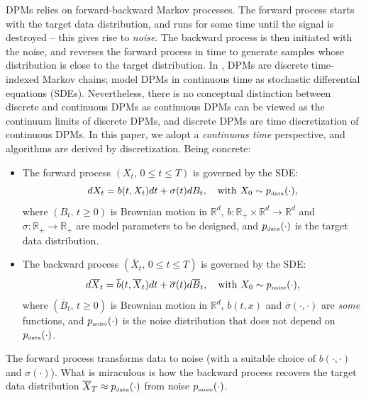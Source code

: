 \documentclass[letterpaper,11pt,reqno]{amsart}
\numberwithin{equation}{section}
\begin{document}
\quad DPMs relies on forward-backward Markov processes.
The forward process starts with the target data distribution, 
and runs for some time until the signal is destroyed --
this gives rise to {\em noise}. 
The backward process is then initiated with the noise, 
and reverses the forward process in time to generate samples
whose distribution is close to the target distribution.
In \cite{Song19, Ho20, Austin21}, DPMs are discrete time-indexed Markov chains;
\cite{Song20, Song21, Chen23} model DPMs in continuous time as 
stochastic differential equations (SDEs).
Nevertheless,
there is no conceptual distinction between discrete and continuous DPMs
as continuous DPMs can be viewed as the continuum limits of discrete DPMs,
and discrete DPMs are time discretization of continuous DPMs.
In this paper, we adopt a {\em continuous time} perspective,
and algorithms are derived by discretization.
Being concrete:
\begin{itemize}[itemsep = 3 pt]
\item
The forward process $(X_t, \, 0 \le t \le T)$ is governed by the SDE:
\begin{equation*}
dX_t = b(t,X_t)  dt + \sigma (t) dB_t, \quad \mbox{with } X_0  \sim p_{\tiny \mbox{data}}(\cdot),
\end{equation*}
where $(B_t, \, t \ge 0)$ is Brownian motion in $\mathbb{R}^d$, 
$b: \mathbb{R}_+ \times \mathbb{R}^d \to \mathbb{R}^d$ and 
 $\sigma: \mathbb{R}_+  \to \mathbb{R}_+$
are model parameters to be designed,
and $p_{\tiny \mbox{data}}(\cdot)$ is the target data distribution.
\item
The backward process $(\overline{X}_t, \, 0 \le t \le T)$ is governed by the SDE:
\begin{equation*}
d\overline{X}_t = \overline{b}(t, \overline{X}_t) dt + \overline{\sigma} (t)  d\overline{B}_t, \quad \mbox{with } X_0  \sim p_{\tiny \mbox{noise}}(\cdot),
\end{equation*}
where $(\overline{B}_t, \, t \ge 0)$ is Brownian motion in $\mathbb{R}^d$,
$\overline{b}(t,x)$ and $\overline{\sigma}(\cdot,\cdot)$ are {\em some} functions,
and $p_{\tiny \mbox{noise}}(\cdot)$ is the noise distribution that does not depend on $p_{\tiny \mbox{data}}(\cdot)$.
\end{itemize}
The forward process transforms data
to noise (with a suitable choice of $b(\cdot, \cdot)$ and $\sigma(\cdot)$).
What is miraculous is how the backward process recovers the target data distribution 
$\overline{X}_T \approx p_{\tiny \mbox{data}}(\cdot)$ from noise $p_{\tiny \mbox{noise}}(\cdot)$.
\end{document}
